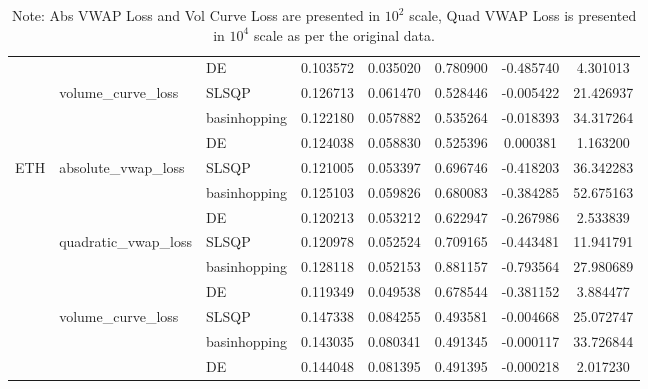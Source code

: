 \begin{table}[H]
{\begin{tabular}{llllcccc}
         &  & DE & 0.103572 & 0.035020 & 0.780900 & -0.485740 & 4.301013 \\
        \cline{2-8}
         & \multirow{3}{*}{volume\_curve\_loss} & SLSQP & 0.126713 & 0.061470 & 0.528446 & -0.005422 & 21.426937 \\
         &  & basinhopping & 0.122180 & 0.057882 & 0.535264 & -0.018393 & 34.317264 \\
         &  & DE & 0.124038 & 0.058830 & 0.525396 & 0.000381 & 1.163200 \\
        \midrule
        \multirow{9}{*}{ETH} & \multirow{3}{*}{absolute\_vwap\_loss} & SLSQP & 0.121005 & 0.053397 & 0.696746 & -0.418203 & 36.342283 \\
         &  & basinhopping & 0.125103 & 0.059826 & 0.680083 & -0.384285 & 52.675163 \\
         &  & DE & 0.120213 & 0.053212 & 0.622947 & -0.267986 & 2.533839 \\
        \cline{2-8}
         & \multirow{3}{*}{quadratic\_vwap\_loss} & SLSQP & 0.120978 & 0.052524 & 0.709165 & -0.443481 & 11.941791 \\
         &  & basinhopping & 0.128118 & 0.052153 & 0.881157 & -0.793564 & 27.980689 \\
         &  & DE & 0.119349 & 0.049538 & 0.678544 & -0.381152 & 3.884477 \\
        \cline{2-8}
         & \multirow{3}{*}{volume\_curve\_loss} & SLSQP & 0.147338 & 0.084255 & 0.493581 & -0.004668 & 25.072747 \\
         &  & basinhopping & 0.143035 & 0.080341 & 0.491345 & -0.000117 & 33.726844 \\
         &  & DE & 0.144048 & 0.081395 & 0.491395 & -0.000218 & 2.017230 \\
        \bottomrule
        \end{tabular}
    }
    \caption*{Note: Abs VWAP Loss and Vol Curve Loss are presented in $10^2$ scale, Quad VWAP Loss is presented in $10^4$ scale as per the original data.}
\end{table}